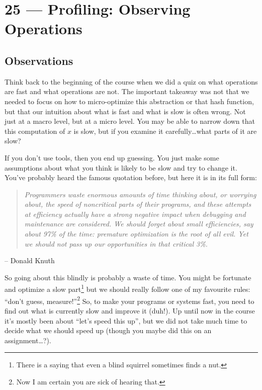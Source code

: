 \documentclass[a4paper]{report}
\begin{document}
\chapter*{25 --- Profiling: Observing Operations}


\section*{Observations}

Think back to the beginning of the course when we did a quiz on what operations are fast and what operations are not. The important takeaway was not that we needed to focus on how to micro-optimize this abstraction or that hash function, but that our intuition about what is fast and what is slow is often wrong. Not just at a macro level, but at a micro level. You may be able to narrow down that this computation of $x$ is slow, but if you examine it carefully\ldots what parts of it are slow?

If you don't use tools, then you end up guessing. You just make some assumptions about what you think is likely to be slow and try to change it. You've probably heard the famous quotation before, but here it is in its full form:

\begin{quote}
\textit{Programmers waste enormous amounts of time thinking about, or worrying about, the speed of noncritical parts of their programs, and these attempts at efficiency actually have a strong negative impact when debugging and maintenance are considered. We should forget about small efficiencies, say about 97\% of the time: premature optimization is the root of all evil. Yet we should not pass up our opportunities in that critical 3\%.}
\end{quote}
	\hfill -- Donald Knuth

So going about this blindly is probably a waste of time. You might be fortunate and optimize a slow part\footnote{There is a saying that even a blind squirrel sometimes finds a nut.} but we should really follow one of my favourite rules: ``don't guess, measure!''\footnote{Now I am certain you are sick of hearing that.} So, to make your programs or systems fast, you need to find out what is currently slow and improve it (duh!). Up until now in the course it's mostly been about ``let's speed this up'', but we did not take much time to decide what we should speed up (though you maybe did this on an assignment\ldots?).
\end{document}

